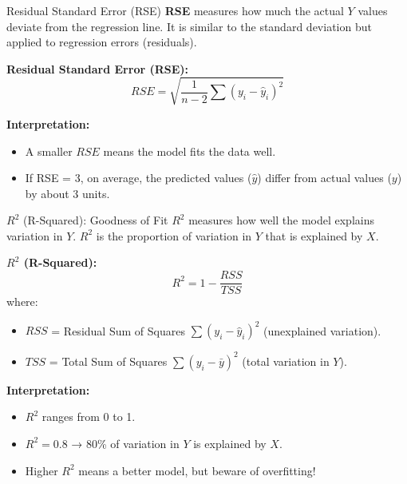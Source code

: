 \documentclass[aspectratio=169,xcolor=dvipsnames]{beamer}
\begin{document}
\begin{frame}{Residual Standard Error (RSE)}
\textbf{RSE} measures how much the actual \( Y \) values deviate from the regression line. It is similar to the standard deviation but applied to regression errors (residuals).
    
    \bigskip
    
    \textbf{Residual Standard Error (RSE):}
    \begin{equation}
        RSE = \sqrt{\frac{1}{n-2} \sum (y_i - \hat{y}_i)^2}
    \end{equation}


    \bigskip

    \textbf{Interpretation:}
    \begin{itemize}
        \item A smaller \( RSE \) means the model fits the data well.
        \item If RSE = 3, on average, the predicted values ($\hat{y}$) differ from actual values ($y$) by about 3 units.
    \end{itemize}
\end{frame}
\begin{frame}{\( R^2 \) (R-Squared): Goodness of Fit}
\textbf{\( R^2 \)} measures how well the model explains variation in \( Y \). \( R^2 \) is the proportion of variation in \( Y \) that is explained by \( X \).
    
    \bigskip
    
    \textbf{\( R^2 \) (R-Squared):}
    \begin{equation}
        R^2 = 1 - \frac{RSS}{TSS}
    \end{equation}
    where:
    \begin{itemize}
        \item \( RSS \) = Residual Sum of Squares \( \sum (y_i - \hat{y}_i)^2 \) (unexplained variation).
        \item \( TSS \) = Total Sum of Squares \( \sum (y_i - \bar{y})^2 \) (total variation in \( Y \)).
    \end{itemize}

    \bigskip

    \textbf{Interpretation:}
    \begin{itemize}
        \item \( R^2 \) ranges from 0 to 1.
        \item \( R^2 = 0.8 \) → 80\% of variation in \( Y \) is explained by \( X \).
        \item Higher \( R^2 \) means a better model, but beware of overfitting!
    \end{itemize}
\end{frame}
\end{document}
